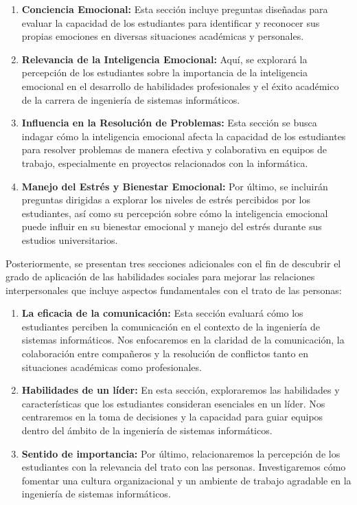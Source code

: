 \documentclass[journal]{IEEEtran}
\begin{document}
\begin{enumerate}
	\item \textbf{Conciencia Emocional: }Esta sección incluye preguntas diseñadas para evaluar la capacidad de los estudiantes para identificar y reconocer sus propias emociones en diversas situaciones académicas y personales.
	\item \textbf{Relevancia de la Inteligencia Emocional:} Aquí, se explorará la percepción de los estudiantes sobre la importancia de la inteligencia emocional en el desarrollo de habilidades profesionales y el éxito académico de la carrera de ingeniería de sistemas informáticos.
	\item \textbf{Influencia en la Resolución de Problemas:} Esta sección se busca indagar cómo la inteligencia emocional afecta la capacidad de los estudiantes para resolver problemas de manera efectiva y colaborativa en equipos de trabajo, especialmente en proyectos relacionados con la informática.
	\item \textbf{Manejo del Estrés y Bienestar Emocional:} Por último, se incluirán preguntas dirigidas a explorar los niveles de estrés percibidos por los estudiantes, así como su percepción sobre cómo la inteligencia emocional puede influir en su bienestar emocional y manejo del estrés durante sus estudios universitarios.
\end{enumerate}

Posteriormente, se presentan tres secciones adicionales con el fin de descubrir el grado de aplicación de las habilidades sociales para mejorar las relaciones interpersonales que incluye aspectos fundamentales con el trato de las personas:

\begin{enumerate}
	\item \textbf{La eficacia de la comunicación: }Esta sección evaluará cómo los estudiantes perciben la comunicación en el contexto de la ingeniería de sistemas informáticos. Nos enfocaremos en la claridad de la comunicación, la colaboración entre compañeros y la resolución de conflictos tanto en situaciones académicas como profesionales.
	\item \textbf{Habilidades de un líder: }En esta sección, exploraremos las habilidades y características que los estudiantes consideran esenciales en un líder. Nos centraremos en la toma de decisiones y la capacidad para guiar equipos dentro del ámbito de la ingeniería de sistemas informáticos.
	\item \textbf{Sentido de importancia:} Por último, relacionaremos la percepción de los estudiantes con la relevancia del trato con las personas. Investigaremos cómo fomentar una cultura organizacional y un ambiente de trabajo agradable en la ingeniería de sistemas informáticos.
\end{enumerate}
\end{document}
